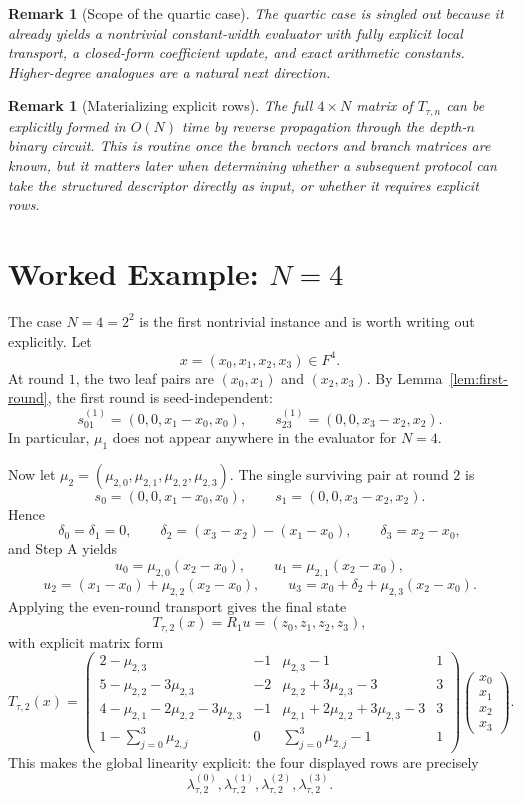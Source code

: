 \documentclass[11pt]{article}
\newtheorem{remark}[theorem]{Remark}
\begin{document}
\begin{remark}[Scope of the quartic case]
\label{rem:quartic}
The quartic case is singled out because it already yields a nontrivial constant-width evaluator with fully explicit local transport, a closed-form coefficient update, and exact arithmetic constants. Higher-degree analogues are a natural next direction.
\end{remark}

\begin{remark}[Materializing explicit rows]
\label{rem:rows}
The full \(4\times N\) matrix of \(T_{\tau,n}\) can be explicitly formed in \(O(N)\) time by reverse propagation through the depth-\(n\) binary circuit. This is routine once the branch vectors and branch matrices are known, but it matters later when determining whether a subsequent protocol can take the structured descriptor directly as input, or whether it requires explicit rows.
\end{remark}

\section[Worked Example: N=4]{Worked Example: \(N=4\)}

The case \(N=4=2^2\) is the first nontrivial instance and is worth writing out explicitly. Let
\[
x=(x_0,x_1,x_2,x_3)\in F^4.
\]
At round \(1\), the two leaf pairs are \((x_0,x_1)\) and \((x_2,x_3)\). By Lemma~\ref{lem:first-round}, the first round is seed-independent:
\[
s_{01}^{(1)}=(0,0,x_1-x_0,x_0),
\qquad
s_{23}^{(1)}=(0,0,x_3-x_2,x_2).
\]
In particular, \(\mu_1\) does not appear anywhere in the evaluator for \(N=4\).

Now let \(\mu_2=(\mu_{2,0},\mu_{2,1},\mu_{2,2},\mu_{2,3})\). The single surviving pair at round \(2\) is
\[
s_0=(0,0,x_1-x_0,x_0),
\qquad
s_1=(0,0,x_3-x_2,x_2).
\]
Hence
\[
\delta_0=\delta_1=0,
\qquad
\delta_2=(x_3-x_2)-(x_1-x_0),
\qquad
\delta_3=x_2-x_0,
\]
and Step A yields
\[
u_0=\mu_{2,0}(x_2-x_0),
\qquad
u_1=\mu_{2,1}(x_2-x_0),
\]
\[
u_2=(x_1-x_0)+\mu_{2,2}(x_2-x_0),
\qquad
u_3=x_0+\delta_2+\mu_{2,3}(x_2-x_0).
\]
Applying the even-round transport gives the final state
\[
T_{\tau,2}(x)=R_1u=(z_0,z_1,z_2,z_3),
\]
with explicit matrix form
\[
T_{\tau,2}(x)=
\begin{pmatrix}
2-\mu_{2,3} & -1 & \mu_{2,3}-1 & 1\\
5-\mu_{2,2}-3\mu_{2,3} & -2 & \mu_{2,2}+3\mu_{2,3}-3 & 3\\
4-\mu_{2,1}-2\mu_{2,2}-3\mu_{2,3} & -1 & \mu_{2,1}+2\mu_{2,2}+3\mu_{2,3}-3 & 3\\
1-\sum_{j=0}^{3}\mu_{2,j} & 0 & \sum_{j=0}^{3}\mu_{2,j}-1 & 1
\end{pmatrix}
\begin{pmatrix}
x_0\\x_1\\x_2\\x_3
\end{pmatrix}.
\]
This makes the global linearity explicit: the four displayed rows are precisely
\[
\lambda_{\tau,2}^{(0)},\lambda_{\tau,2}^{(1)},\lambda_{\tau,2}^{(2)},\lambda_{\tau,2}^{(3)}.
\]
\end{document}
